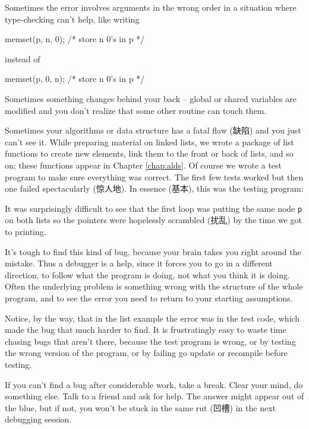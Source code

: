 Sometimes the error involves arguments in the wrong order in a situation
where type-checking can't help, like writing
\begin{badcode}
    memset(p, n, 0);    /* store n 0's in p */
\end{badcode}
instead of 
\begin{wellcode}
    memset(p, 0, n);    /* store n 0's in p */
\end{wellcode}

Sometimes something changes behind your back -- global or shared variables
are modified and you don't realize that some other routine can touch them.

Sometimes your algorithms or data structure has a fatal flaw (缺陷) and you
just can't see it. While preparing material on linked lists, we wrote a
package of list functions to create new elements, link them to the front or
back of lists, and so on; these functions appear in Chapter
\ref{chap:alds}. Of course we wrote a test program to make sure everything
was correct. The first few tests worked but then one failed spectacularly
(惊人地). In essence (基本), this was the testing program:
It was surprisingly difficult to see that the first loop was putting the
same node \verb'p' on both lists so the pointers were hopelessly scrambled
(扰乱) by the time we got to printing.

It's tough to find this kind of bug, because your brain takes you right
around the mistake. Thus a debugger is a help, since it forces you to go in
a different direction, to follow what the program is doing, not what you
think it is doing. Often the underlying problem is something wrong with the
structure of the whole program, and to see the error you need to return to
your starting assumptions.

Notice, by the way, that in the list example the error was in the test
code, which made the bug that much harder to find. It is frustratingly easy
to waste time chasing bugs that aren't there, because the test program is
wrong, or by testing the wrong version of the program, or by failing go
update or recompile before testing.

If you can't find a bug after considerable work, take a break. Clear your
mind, do something else. Talk to a friend and ask for help. The answer
might appear out of the blue, but if not, you won't be stuck in the same
rut (凹槽) in the next debugging session.


